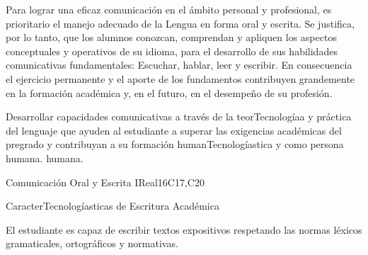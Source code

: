 \begin{syllabus}


\begin{justification}
Para lograr una eficaz comunicación en el ámbito personal y profesional, es prioritario el manejo adecuado de la Lengua en forma oral y escrita. Se justifica, por lo tanto, que los alumnos conozcan, comprendan y apliquen los aspectos conceptuales y operativos de su idioma, para el desarrollo de sus habilidades comunicativas fundamentales: Escuchar, hablar, leer y escribir.
En consecuencia el ejercicio permanente y el aporte de los fundamentos contribuyen grandemente en la formación académica y, en el futuro, en el desempeño de su profesión.
\end{justification}

\begin{goals}
\item Desarrollar capacidades comunicativas a través de la teorTecnologíaa y práctica del lenguaje que ayuden al estudiante a superar las exigencias académicas del pregrado y contribuyan a su formación humanTecnologíastica y como persona humana. humana.
\end{goals}

\begin{outcomes}
   \item {}
   \item {}
   \item {}
\end{outcomes}

\begin{competences}
    \item {}
    \item {}
    \item {}
\end{competences}

\begin{unit}{}{Comunicación Oral y Escrita I}{Real}{16}{C17,C20}
\begin{topics}
      \item CaracterTecnologíasticas de Escritura Académica
\end{topics}

\begin{learningoutcomes}
   \item El estudiante es capaz de escribir textos expositivos respetando las normas léxicos gramaticales, ortográficos y normativas.
\end{learningoutcomes}
\end{unit}


\begin{coursebibliography}
\end{coursebibliography}

\end{syllabus}
